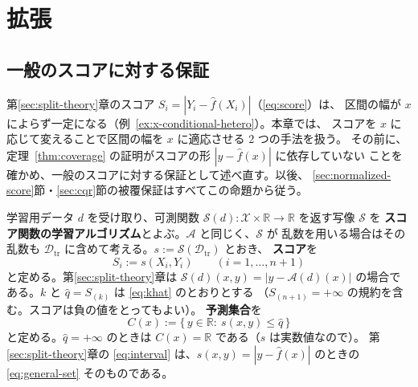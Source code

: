 \documentclass[a4paper,11pt]{jsarticle}
\theoremstyle{definition}
\theoremstyle{plain}
\theoremstyle{remark}
\newcommand{\Real}{\mathbb{R}}
\newcommand{\Dtr}{\mathcal{D}_{\mathrm{tr}}}     %
\newcommand{\qhat}{\hat{q}}
\newcommand{\fhat}{\hat{f}}
\begin{document}
\section{拡張}

\subsection{一般のスコアに対する保証}
\label{sec:general-score}

第\ref{sec:split-theory}章のスコア $S_i=|Y_i-\fhat(X_i)|$（\eqref{eq:score}）は、
区間の幅が $x$ によらず一定になる（例~\ref{ex:x-conditional-hetero}）。本章では、
スコアを $x$ に応じて変えることで区間の幅を $x$ に適応させる $2$ つの手法を扱う。
その前に、定理~\ref{thm:coverage} の証明がスコアの形 $|y-\fhat(x)|$ に依存していない
ことを確かめ、一般のスコアに対する保証として述べ直す。以後、
\ref{sec:normalized-score}節・\ref{sec:cqr}節の被覆保証はすべてこの命題から従う。

学習用データ $d$ を受け取り、可測関数
$\mathcal{S}(d)\colon\mathcal{X}\times\Real\to\Real$ を返す写像 $\mathcal{S}$ を
\textbf{スコア関数の学習アルゴリズム}とよぶ。$\mathcal{A}$ と同じく、$\mathcal{S}$ が
乱数を用いる場合はその乱数も $\Dtr$ に含めて考える。$s:=\mathcal{S}(\Dtr)$ とおき、
\textbf{スコア}を
\begin{equation}
  \label{eq:general-score}
  S_i:=s(X_i,Y_i)\qquad(i=1,\dots,n+1)
\end{equation}
と定める。第\ref{sec:split-theory}章は $\mathcal{S}(d)(x,y)=|y-\mathcal{A}(d)(x)|$
の場合である。$k$ と $\qhat=S_{(k)}$ は \eqref{eq:khat} のとおりとする
（$S_{(n+1)}=+\infty$ の規約を含む。スコアは負の値をとってもよい）。
\textbf{予測集合}を
\begin{equation}
  \label{eq:general-set}
  C(x):=\{\,y\in\Real:\ s(x,y)\le\qhat\,\}
\end{equation}
と定める。$\qhat=+\infty$ のときは $C(x)=\Real$ である（$s$ は実数値なので）。
第\ref{sec:split-theory}章の \eqref{eq:interval} は、$s(x,y)=|y-\fhat(x)|$ のときの
\eqref{eq:general-set} そのものである。
\end{document}
